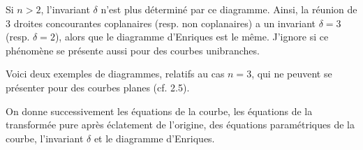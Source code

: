 \begin{center}
\end{center}
Si $n > 2$, l'invariant $\delta$ n'est plus déterminé par ce diagramme. Ainsi, la réunion de 3 droites concourantes coplanaires (resp. non coplanaires) a un invariant $\delta = 3$ (resp. $\delta = 2$), alors que le diagramme d'Enriques est le même. J'ignore si ce phénomène se présente aussi pour des courbes unibranches.

Voici deux exemples de diagrammes, relatifs au cas $n = 3$, qui ne peuvent se présenter pour des courbes planes (cf. 2.5).

On donne successivement les équations de la courbe, les équations
de la transformée pure après éclatement de l'origine, des équations paramétriques de la courbe, l'invariant $\delta$ et le diagramme d'Enriques.

